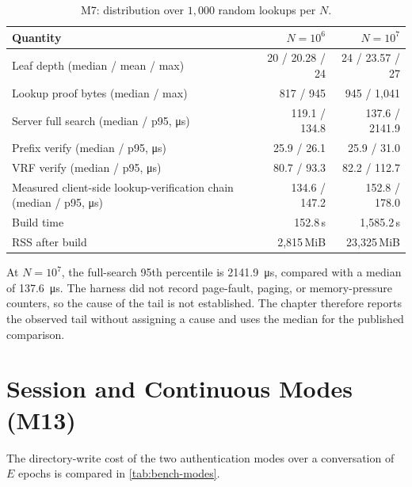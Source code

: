 \begin{table}[ht]
\centering
\caption{M7: distribution over $1{,}000$ random lookups per $N$.}
\label{tab:bench-scale}
\small
\begin{threeparttable}
\begin{tabular}{@{}lrr@{}}
\toprule
Quantity & $N=10^6$ & $N=10^7$ \\
\midrule
Leaf depth (median / mean / max) & 20 / 20.28 / 24 & 24 / 23.57 / 27 \\
Lookup proof bytes (median / max) & 817 / 945 & 945 / 1{,}041 \\
Server full search (median / p95, \si{\micro\second}) & 119.1 / 134.8 & 137.6 / 2141.9\tnote{$\dagger$} \\
Prefix verify (median / p95, \si{\micro\second}) & 25.9 / 26.1 & 25.9 / 31.0 \\
VRF verify (median / p95, \si{\micro\second}) & 80.7 / 93.3 & 82.2 / 112.7 \\
Measured client-side lookup-verification chain (median / p95, \si{\micro\second}) & 134.6 / 147.2 & 152.8 / 178.0 \\
Build time & 152.8\,s & 1{,}585.2\,s \\
RSS after build & 2{,}815\,MiB & 23{,}325\,MiB \\
\bottomrule
\end{tabular}
\begin{tablenotes}
\footnotesize
\item[$\dagger$] At $N=10^7$, the full-search 95th percentile is
\SI{2141.9}{\micro\second}, compared with a median of
\SI{137.6}{\micro\second}. The harness did not record page-fault, paging, or memory-pressure
counters, so the cause of the tail is not established. The chapter therefore reports the observed
tail without assigning a cause and uses the median for the published comparison.
\end{tablenotes}
\end{threeparttable}
\end{table}

\FloatBarrier
\section{Session and Continuous Modes (M13)}\label{sec:bench-modes}

The directory-write cost of the two authentication modes over a conversation of $E$ epochs is
compared in \cref{tab:bench-modes}.

